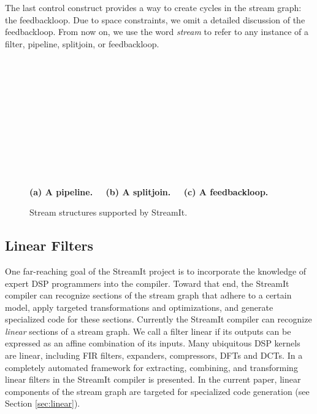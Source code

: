 The last control construct provides a way to create cycles in the
stream graph: the feedbackloop.  Due to space constraints, we omit a
detailed discussion of the feedbackloop. From now on, we use the word
{\it stream} to refer to any instance of a filter, pipeline,
splitjoin, or feedbackloop.

\begin{figure}[t]
\begin{center}
\begin{minipage}{0.46in}
\centering
{} \\
\end{minipage} 
~
\begin{minipage}{1.3in}
\centering
{} \\
\end{minipage}
~
\begin{minipage}{1.02in}
\centering
{} \\
\end{minipage} 
\\ ~ \\ {\bf \protect\small (a) A pipeline. ~~(b) A splitjoin. ~~(c) A feedbackloop.}
\caption{\protect\small Stream structures supported by StreamIt.
\protect\label{fig:structures}}
\end{center}
\vspace{-18pt}
\end{figure}

\subsection{Linear Filters}
One far-reaching goal of the StreamIt project is to incorporate the
knowledge of expert DSP programmers into the compiler.  Toward that
end, the StreamIt compiler can recognize sections of the stream graph
that adhere to a certain model, apply targeted transformations and
optimizations, and generate specialized code for these sections.
Currently the StreamIt compiler can recognize {\it linear} sections of
a stream graph. We call a filter linear if its outputs can be
expressed as an affine combination of its inputs.  Many ubiquitous DSP
kernels are linear, including FIR filters, expanders, compressors,
DFTs and DCTs.  In \cite{streamit-linear} a completely automated
framework for extracting, combining, and transforming linear filters
in the StreamIt compiler is presented.  In the current paper, linear
components of the stream graph are targeted for specialized code
generation (see Section \ref{sec:linear}).

